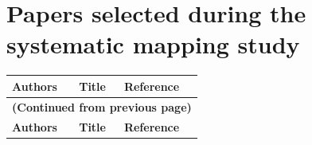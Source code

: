 
%

\appendix
\chapter{Papers selected during the systematic mapping study}
\label{app:papers}
\renewcommand{\arraystretch}{0.5} %
\setlength{\tabcolsep}{4pt}

\begin{longtable}{p{5cm} p{7.5cm} p{2.5cm}}  
  

    \toprule
    \textbf{Authors} & \textbf{Title} & \textbf{Reference} \\ 
    \midrule
    \endfirsthead

    \multicolumn{3}{c}{\textbf{(Continued from previous page)}} \\
    \toprule
    \textbf{Authors} & \textbf{Title} & \textbf{Reference} \\ 
    \midrule
    \endhead


\end{longtable}
